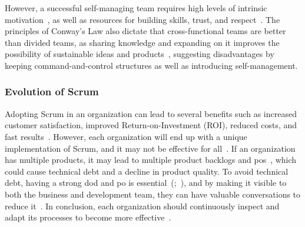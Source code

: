 However, a successful \gls{self-managing} team requires high levels of intrinsic motivation~\cite[p.~12]{wohllebeapplying}, as well as resources for building skills, trust, and respect~\cite[p.~4]{Schwaber2020Tsg}. The \glspl{principle} of Conway's Law also dictate that cross-functional teams are better than divided teams, as sharing knowledge and expanding on it improves the possibility of sustainable ideas and products~\cite[p.~24]{Koning2019AT}, suggesting disadvantages by keeping command-and-control structures as well as introducing self-management.


\subsubsection*{Evolution of Scrum}\label{subsubsec:ScrumsEvolution}
Adopting Scrum in an organization can lead to several benefits such as increased \gls{customer} satisfaction, improved Return-on-Investment (ROI), reduced costs, and fast results~\cite[p.~6]{Rubin2012ESA}. However, each organization will end up with a unique implementation of Scrum, and it may not be effective for all~\cite[p.~62]{Rubin2012ESA}. If an organization has multiple products, it may lead to multiple product backlogs and \acp{po}~\cite[p.~117]{Rubin2012ESA}, which could cause technical debt and a decline in product quality. To avoid technical debt, having a strong \gls{dod} and \ac{po} is essential~(;~), and by making it visible to both the business and development team, they can have valuable conversations to reduce it~\cite[p.~153]{Rubin2012ESA}. In conclusion, each organization should continuously inspect and adapt its processes to become more effective~\cite[p.~395]{Rubin2012ESA}.


